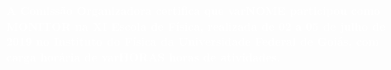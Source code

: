 \documentclass[fontsize=14pt]{scrartcl}
\begin{document}
\thispagestyle{empty}
\vspace*{7.5cm}
\hspace{7cm}
\begin{minipage}[t][7cm][t]{19cm}
\normalfont \bfseries
\textcolor{white}{A Comissão Organizadora certifica que varNOME participou como MONITOR na \mbox{XI} \mbox{Escola} de \mbox{Física}, realizada de 02 a 05 de julho de 2019 no Instituto do Física da Universidade Federal de Goiás, com carga horária de varHORAS horas de atividades.}
\end{minipage}
\end{document}
